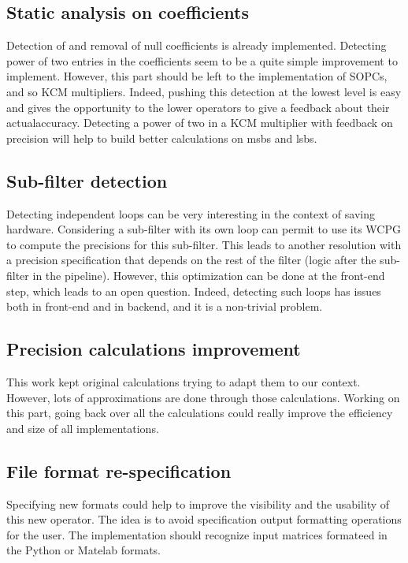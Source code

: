 \subsection{Static analysis on coefficients}
	Detection of and removal of null coefficients is already implemented.
	Detecting power of two entries in the coefficients seem to be a quite simple improvement to implement.
	However, this part should be left to the implementation of SOPCs, and so KCM multipliers.
	Indeed, pushing this detection at the lowest level is easy and gives the opportunity to the lower operators to give a feedback about their actualaccuracy.
	Detecting a power of two in a KCM multiplier with feedback on precision will help to build better calculations on msbs and lsbs.



\subsection{Sub-filter detection}
	Detecting independent loops can be very interesting in the context of saving hardware.
	Considering a sub-filter with its own loop can permit to use its WCPG to compute the precisions for this sub-filter.
	This leads to another resolution with a precision specification that depends on the rest of the filter (logic after the sub-filter in the pipeline).
	However, this optimization can be done at the front-end step, which leads to an open question.
	Indeed, detecting such loops has issues both in front-end and in backend, and it is a non-trivial problem.

\subsection{Precision calculations improvement}
	This work kept original calculations trying to adapt them to our context.
	However, lots of approximations are done through those calculations.
	Working on this part, going back over all the calculations could really improve the efficiency and size of all implementations.


\subsection{File format re-specification}
	Specifying new formats could help to improve the visibility and the usability of this new operator.
	The idea is to avoid specification output formatting operations for the user.
	The implementation should recognize input matrices formateed in the Python or Matelab formats.
